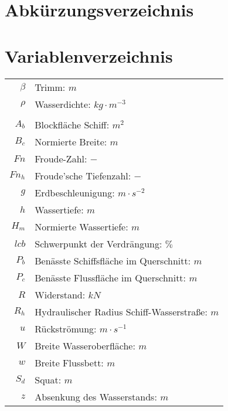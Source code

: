 \newpage
\chapter*{Abkürzungsverzeichnis}
\begin{acronym}%
\end{acronym}

\newpage
\chapter*{Variablenverzeichnis}
\begin{table}[ht]
	\begin{tabular}{rl}
	
		\(\beta\) & Trimm: \(m\)\\		
		\(\rho\)& Wasserdichte: \(kg\cdot m^{-3}\)	\\		
		&	\\
		\(A_b\)& Blockfläche Schiff: \(m^2\)\\
		\(B_c\)& Normierte Breite: \(m\)\\
		\(Fn\) & Froude-Zahl: \(-\)\\
		\(Fn_h\) & Froude'sche Tiefenzahl: \(-\)\\	
		\(g\) & Erdbeschleunigung: \(m \cdot s^{-2}\)\\
		\(h\)& Wassertiefe: \(m\)\\
		\(H_m\)& Normierte Wassertiefe: \(m\)\\
		\(lcb\) & Schwerpunkt der Verdrängung: \(\%\)\\
		\(P_b\)& Benässte Schiffsfläche im Querschnitt: \(m\)\\
		\(P_c\)& Benässte Flussfläche im Querschnitt: \(m\)\\
		\(R\) & Widerstand: \(kN\)\\
		\(R_h\)& Hydraulischer Radius Schiff-Wasserstraße: \(m\)\\		
		
		\(u\) & Rückströmung: \(m\cdot s^{-1}\)\\
		\(W\)& Breite Wasseroberfläche: \(m\)\\
		\(w\)& Breite Flussbett: \(m\)\\
		\(S_d\) & Squat: \(m\)\\	
	 	\(z\) & Absenkung des Wasserstands: \(m\)\\
	\end{tabular}
\end{table}